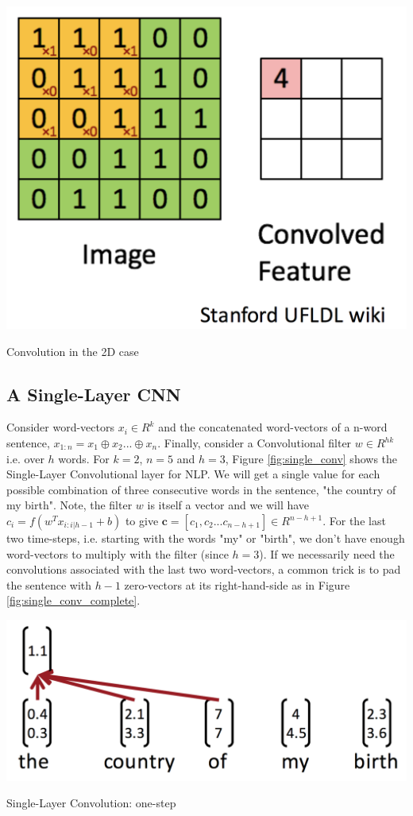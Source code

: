 \documentclass{tufte-handout}
\begin{document}
\begin{marginfigure}%
  \includegraphics[width=\linewidth]{2d_convolution}
  \caption{Convolution in the 2D case}
  \label{fig:2d_conv}
\end{marginfigure}

\subsection{A Single-Layer CNN}
Consider word-vectors $x_i\in R^k$ and the concatenated word-vectors of a n-word sentence, $x_{1:n}=x_1\oplus x_2...\oplus x_n$. Finally, consider a Convolutional filter $w\in R^{hk}$ i.e. over $h$ words. For $k=2$, $n=5$ and $h=3$, Figure \ref{fig:single_conv} shows the  Single-Layer Convolutional layer for NLP. We will get a single value for each possible combination of three consecutive words in the sentence, "the country of my birth". Note, the filter $w$ is itself a vector and we will have $c_i=f(w^Tx_{i:i|h-1}+b)$ to give $\textbf{c}=[c_1,c_2... c_{n-h+1}]\in R^{n-h+1}$. For the last two time-steps, i.e. starting with the words "my" or "birth", we don't have enough word-vectors to multiply with the  filter (since $h=3$). If we necessarily need the convolutions associated with the last two word-vectors, a common trick is to pad the sentence with $h-1$ zero-vectors at its right-hand-side as in Figure \ref{fig:single_conv_complete}.

\begin{marginfigure}%
  \includegraphics[width=\linewidth]{single-conv}
  \caption{Single-Layer Convolution: one-step}
  \label{fig:single_conv}
\end{marginfigure}
\end{document}
